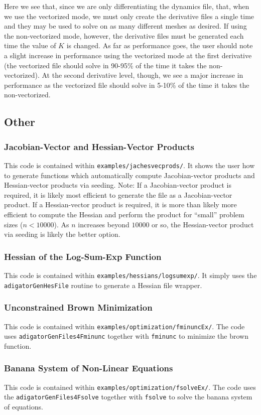 \documentclass[10pt,pdftex]{article}
\begin{document}
Here we see that, since we are only differentiating the dynamics file, that, when we use the vectorized mode, we must only create the derivative files a single time and they may be used to solve on as many different meshes as desired. If using the non-vectorized mode, however, the derivative files must be generated each time the value of $K$ is changed. As far as performance goes, the user should note a slight increase in performance using the vectorized mode at the first derivative (the vectorized file should solve in 90-95\% of the time it takes the non-vectorized). At the second derivative level, though, we see a major increase in performance as the vectorized file should solve in 5-10\% of the time it takes the non-vectorized.

\subsection{Other}
\subsubsection{Jacobian-Vector and Hessian-Vector Products}
This code is contained within \texttt{examples/jachesvecprods/}. It shows the user how to generate functions which automatically compute Jacobian-vector products and Hessian-vector products via seeding. Note: If a Jacobian-vector product is required, it is likely most efficient to generate the file as a Jacobian-vector product. If a Hessian-vector product is required, it is more than likely more efficient to compute the Hessian and perform the product for ``small'' problem sizes ($n < 10000$). As $n$ increases beyond $10000$ or so, the Hessian-vector product via seeding is likely the better option.
\subsubsection{Hessian of the Log-Sum-Exp Function}
This code is contained within \texttt{examples/hessians/logsumexp/}. It simply uses the \texttt{adigatorGenHesFile} routine to generate a Hessian file wrapper.
\subsubsection{Unconstrained Brown Minimization}
This code is contained within \texttt{examples/optimization/fminuncEx/}. The code uses \texttt{adigatorGenFiles4Fminunc} together with \texttt{fminunc} to minimize the brown function.
\subsubsection{Banana System of Non-Linear Equations}
This code is contained within \texttt{examples/optimization/fsolveEx/}. The code uses the \texttt{adigatorGenFiles4Fsolve} together with \texttt{fsolve} to solve the banana system of equations.
\end{document}
